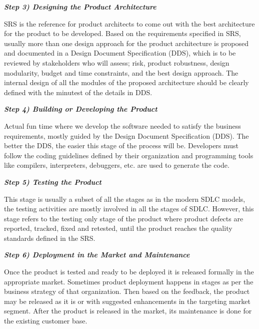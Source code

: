 \documentclass{article}
\begin{document}
{\textbf{\textit{Step 3) Designing the Product Architecture}}

SRS is the reference for product architects to come out with the best architecture for the product to be developed. Based on the requirements specified in SRS, usually more than one design approach for the product architecture is proposed and documented in a Design Document Specification (DDS), which is to be reviewed by stakeholders who will assess; risk, product robustness, design modularity, budget and time constraints, and the best design approach. The internal design of all the modules of the proposed architecture should be clearly defined with the minutest of the details in DDS.

\vspace{0.3cm}

\textbf{\textit{Step 4) Building or Developing the Product}}

Actual fun time where we develop the software needed to satisfy the business requirements, mostly guided by the Design Document Specification (DDS). The better the DDS, the easier this stage of the process will be. Developers must follow the coding guidelines defined by their organization and programming tools like compilers, interpreters, debuggers, etc. are used to generate the code.

\vspace{0.3cm}

\textbf{\textit{Step 5) Testing the Product}}

This stage is usually a subset of all the stages as in the modern SDLC models, the testing activities are mostly involved in all the stages of SDLC. However, this stage refers to the testing only stage of the product where product defects are reported, tracked, fixed and retested, until the product reaches the quality standards defined in the SRS.

\vspace{0.3cm}

\textbf{\textit{Step 6) Deployment in the Market and Maintenance}}

Once the product is tested and ready to be deployed it is released formally in the appropriate market. Sometimes product deployment happens in stages as per the business strategy of that organization. Then based on the feedback, the product may be released as it is or with suggested enhancements in the targeting market segment. After the product is released in the market, its maintenance is done for the existing customer base.

}
\end{document}

